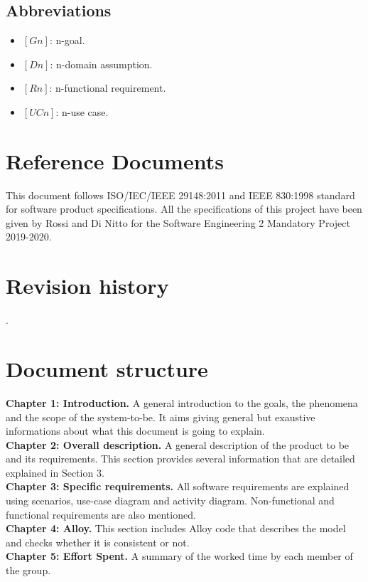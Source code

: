 \documentclass[../RASD.tex]{subfiles}
\begin{document}
    \subsection{Abbreviations}\label{subsec:abbreviations}
    \begin{itemize}
        \item $[Gn]$: n-goal.
        \item $[Dn]$: n-domain assumption.
        \item $[Rn]$: n-functional requirement.
        \item $[UCn]$: n-use case.
    \end{itemize}

    \section{Reference Documents}\label{sec:reference-documents}
    This document follows ISO/IEC/IEEE 29148:2011 and IEEE 830:1998 standard for software product specifications.
    All the specifications of this project have been given by Rossi and Di Nitto for the Software Engineering 2 Mandatory Project 2019-2020.

    \section{Revision history}\label{sec:revision-history}
    .

    \section{Document structure}\label{sec:document-structure}
    \textbf{Chapter 1: Introduction.} A general introduction to the goals, the phenomena and the scope of the system-to-be. It aims giving general but exaustive informations about what this document is going to explain.
    \\
    \textbf{Chapter 2: Overall description.} A general description of the product to be and its requirements. This section provides several information that are detailed explained in Section 3.
    \\
    \textbf{Chapter 3: Specific requirements.} All software requirements are explained using scenarios, use-case diagram and activity diagram. Non-functional and functional requirements are also mentioned.
    \\
    \textbf{Chapter 4: Alloy.} This section includes Alloy code that describes the model and checks whether it is consistent or not.
    \\
    \textbf{Chapter 5: Effort Spent.} A summary of the worked time by each member of the group.
\end{document}
